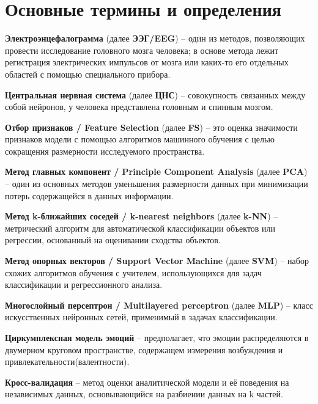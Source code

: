 \documentclass{article}
\begin{document}
\makeTitlePage

{
  \hypersetup{linkcolor=black}
  \tableofcontents
}

\hypersetup{linkcolor=black}

\section{Основные термины и определения}


\textbf{Электроэнцефалограмма} (далее \textbf{ЭЭГ/EEG}) -- один из методов, позволяющих провести исследование головного мозга человека; в основе метода лежит регистрация электрических импульсов от мозга или каких-то его отдельных областей с помощью специального прибора.

\textbf{Центральная нервная система} (далее \textbf{ЦНС}) -- совокупность связанных между собой нейронов, у человека представлена головным и спинным мозгом.

\textbf{Отбор признаков / Feature Selection} (далее \textbf{FS}) -- это оценка значимости признаков модели с помощью алгоритмов машинного обучения с целью сокращения размерности исследуемого пространства.

\textbf{Метод главных компонент / Principle Component Analysis} (далее \textbf{PCA}) -- один из основных методов уменьшения размерности данных при минимизации потерь содержащейся в данных информации.

\textbf{Метод k-ближайших соседей / k-nearest neighbors} (далее \textbf{k-NN}) -- метрический алгоритм для автоматической классификации объектов или регрессии, основанный на оценивании сходства объектов.

\textbf{Метод опорных векторов / Support Vector Machine} (далее \textbf{SVM}) -- набор схожих алгоритмов обучения с учителем, использующихся для задач классификации и регрессионного анализа.

\textbf{Многослойный персептрон / Multilayered perceptron} (далее \textbf{MLP}) -- класс искусственных нейронных сетей, применимый в задачах классификации.

\textbf{Циркумплексная модель эмоций} -- предполагает, что эмоции распределяются в двумерном круговом пространстве, содержащем измерения возбуждения и привлекательности(валентности).

\textbf{Кросс-валидация} -- метод оценки аналитической модели и её поведения на независимых данных, основывающийся на разбиении данных на k частей.
\end{document}
